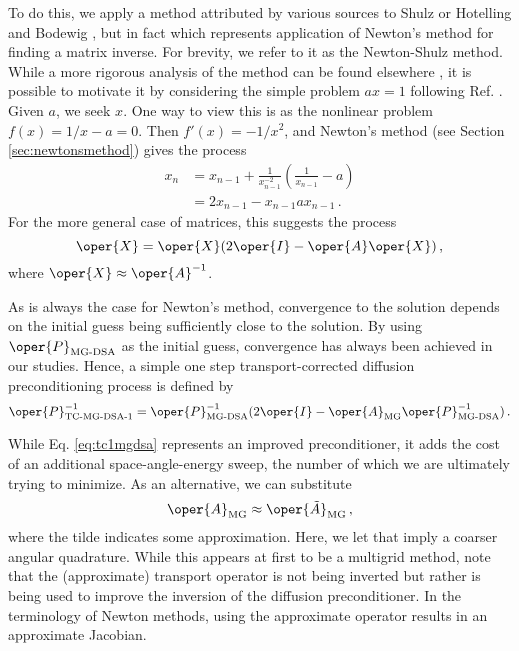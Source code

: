 To do this, we apply a method attributed by various sources to 
Shulz or Hotelling and Bodewig \cite{schulz1933ibr, householder1975tmn}, 
but in fact which represents application of Newton's method for 
finding a matrix inverse.  For brevity, we refer to it as the 
Newton-Shulz method.  While a more rigorous analysis of the method 
can be found elsewhere \cite{householder1975tmn}, it is possible to
motivate it by considering the simple problem $ax=1$ 
following Ref. \cite{chow1998aip}.  Given
$a$, we seek $x$.  One way to view this is as the nonlinear 
problem $f(x) = 1/x-a = 0$.  Then $f'(x) = -1/x^2$, and Newton's 
method (see Section \ref{sec:newtonsmethod}) gives the process
\begin{equation}
\begin{split}
 x_{n} &= x_{n-1} + \frac{1}{x_{n-1}^{-2}} 
           \left( \frac{1}{x_{n-1}} - a \right) \\
       &= 2x_{n-1} - x_{n-1} a x_{n-1} \, .
\end{split}
\end{equation}
For the more general case of matrices, this suggests 
the process 
\begin{equation}
 \oper{X} = \oper{X}(2\oper{I} - \oper{A}\oper{X}) \, ,
\end{equation}
where $\oper{X} \approx \oper{A}^{-1}$.  

As is always the case for Newton's method, convergence 
to the solution depends on the initial guess being sufficiently close to 
the solution.  
By using $\oper{P}_{\text{MG-DSA}}$ as 
the initial guess, convergence has always been achieved in our studies.
Hence, a simple one step transport-corrected diffusion preconditioning 
process is defined by
\begin{equation}
 \oper{P}_{\text{TC-MG-DSA-1}}^{-1} = 
   \oper{P}_{\text{MG-DSA}}^{-1}(2\oper{I} - 
             \oper{A}_{\text{MG}} \oper{P}_{\text{MG-DSA}}^{-1}) \, .
\label{eq:tc1mgdsa}
\end{equation}

While Eq. \ref{eq:tc1mgdsa} represents an improved preconditioner, 
it adds the cost of an additional space-angle-energy sweep, the number 
of which we are ultimately trying to minimize.  As an alternative, 
we can substitute 
\begin{equation}
 \oper{A}_{\text{MG}} \approx \oper{\tilde{A}}_{\text{MG}} \, ,
\end{equation}
where the tilde indicates some approximation.  Here, we let that 
imply a coarser angular quadrature.  While this appears at first to be a 
multigrid method, note that the (approximate) transport operator is 
not being inverted but rather is being used to improve the inversion of 
the diffusion preconditioner.  In the terminology of Newton methods, 
using the approximate operator results in an approximate Jacobian.

